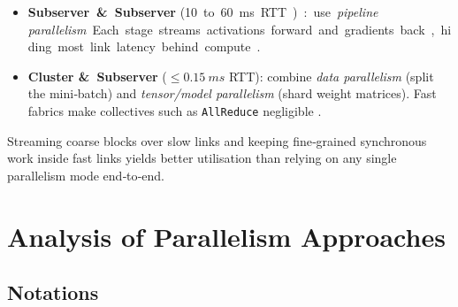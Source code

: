 \documentclass{article}
\begin{document}
\begin{itemize}\setlength\itemsep{0.3em}
  \item \textbf{Subserver \& Subserver} (\SI{10} to \SI{60}{ms} RTT):  
        use \emph{pipeline parallelism}.  
        Each stage streams activations forward and gradients back,
        hiding most link latency behind compute
        \cite{huang2019gpipe, narayanan2019pipedream}.  

  \item \textbf{Cluster \& Subserver} ($\le\!\SI{0.15}{ms}$ RTT):  
        combine \emph{data parallelism} (split the mini‑batch) and
        \emph{tensor/model parallelism} (shard weight matrices).
        Fast fabrics make collectives such as \texttt{AllReduce} negligible
        \cite{shoeybi2019megatron, roberts2023scaling}.
\end{itemize}

Streaming coarse blocks over slow links and keeping fine‑grained synchronous
work inside fast links yields better utilisation than relying on any single
parallelism mode end‑to‑end.






\section{Analysis of Parallelism Approaches}

\subsection{Notations}
\end{document}
